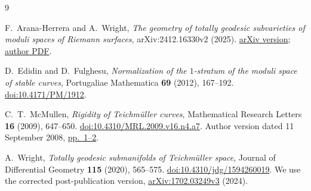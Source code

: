 \documentclass[11pt]{article}
\theoremstyle{definition}
\theoremstyle{remark}
\begin{document}
\begin{thebibliography}{9}

F.~Arana-Herrera and A.~Wright,
\emph{The geometry of totally geodesic subvarieties of moduli spaces of Riemann surfaces},
arXiv:2412.16330v2 (2025).
\href{https://arxiv.org/abs/2412.16330v2}{arXiv version};
\href{https://public.websites.umich.edu/~alexmw/tghhs.pdf}{author PDF}.

D.~Edidin and D.~Fulghesu,
\emph{Normalization of the $1$-stratum of the moduli space of stable curves},
Portugaliae Mathematica \textbf{69} (2012), 167--192.
\href{https://doi.org/10.4171/PM/1912}{doi:10.4171/PM/1912}.

C.~T.~McMullen,
\emph{Rigidity of Teichm\"uller curves},
Mathematical Research Letters \textbf{16} (2009), 647--650.
\href{https://doi.org/10.4310/MRL.2009.v16.n4.a7}{doi:10.4310/MRL.2009.v16.n4.a7}.
Author version dated 11 September 2008,
\href{https://people.math.harvard.edu/~ctm/papers/home/text/papers/rigidity/rigidity.pdf}{pp.~1--2}.

A.~Wright,
\emph{Totally geodesic submanifolds of Teichm\"uller space},
Journal of Differential Geometry \textbf{115} (2020), 565--575.
\href{https://doi.org/10.4310/jdg/1594260019}{doi:10.4310/jdg/1594260019}.
We use the corrected post-publication version,
\href{https://arxiv.org/abs/1702.03249v3}{arXiv:1702.03249v3} (2024).

\end{thebibliography}
\end{document}
